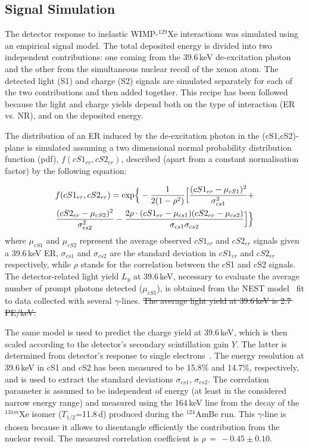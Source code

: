 \subsection{Signal Simulation} 

The detector response to inelastic WIMP-$^{129}$Xe interactions was simulated using an empirical signal model.
The total deposited energy is divided into two independent contributions: one coming from the 39.6\,keV de-excitation photon and the other  from  
the simultaneous nuclear recoil of the xenon atom. The detected light (S1) and charge (S2) signals are simulated separately for each of the two contributions 
and then added together. This recipe has been followed  because the light and charge yields depend both on the type of interaction (ER vs. NR), and on the deposited energy.


The distribution of an ER induced by the de-excitation photon in the (cS1,cS2)-plane  is simulated assuming a two dimensional normal probability distribution function (pdf), $f(cS1_{er},cS2_{er})$, 
described (apart from a constant normalisation factor) by the following equation:

\begin{multline}
	f(cS1_{er},cS2_{er})  = {\rm exp} \Big\{ -\frac{1}{2(1-\rho^2)} \Big[ \frac{(cS1_{er} - \mu_{cS1})^2}{\sigma_{cs1}^2} + \\ 
	 \frac{(cS2_{er} - \mu_{cS2})^2}{\sigma_{cs2}^2} - \frac{2\rho\cdot(cS1_{er} - \mu_{cs1}) (cS2_{er} - \mu_{cs2})} {\sigma_{cs1}\sigma_{cs2}} \Big] \Big\}
\label{f:2dgaus}
\end{multline}
where $\mu_{cS1}$ and $\mu_{cS2}$ 
represent the average observed $cS1_{er}$ and $cS2_{er}$ signals given a 39.6\,keV ER, $\sigma_{cs1}$ and $\sigma_{cs2}$ are the standard deviation in $cS1_{er}$ and $cS2_{er}$ respectively,
while $\rho$ stands for the correlation between the cS1 and cS2 signals. The detector-related light yield $L_y$  at 39.6\,keV, necessary to evaluate the average number of prompt photons detected 
($\mu_{cS1}$), is obtained from the NEST model~\cite{NEST,Geant1,Geant2} fit to data collected with several $\gamma$-lines.
\sout{The average light yield at 39.6\,keV is 2.7\,PE/keV.}

The same model is used to predict the charge yield at 39.6\,keV, which is then scaled according to the detector's secondary scintillation gain $Y$. 
 The latter is determined from detector's response to single electrons~\cite{SingleE}.
The energy resolution at 39.6\,keV in cS1 and cS2 has been measured to be 15.8\% and 14.7\%, respectively, and is used to extract the standard 
deviations $\sigma_{cs1}$, $\sigma_{cs2}$.  The correlation parameter is assumed to be independent of energy (at least in the considered narrow energy range) and measured
using the 164\,keV line from the decay of the $^{131m}$Xe isomer ($T_{1/2}$=11.8\,d) produced during the  $^{124}$AmBe run. This $\gamma$-line is chosen because it allows to disentangle efficiently the contribution from the nuclear recoil. The measured correlation coefficient is $\rho \, = \, -0.45 \pm 0.10$. 


